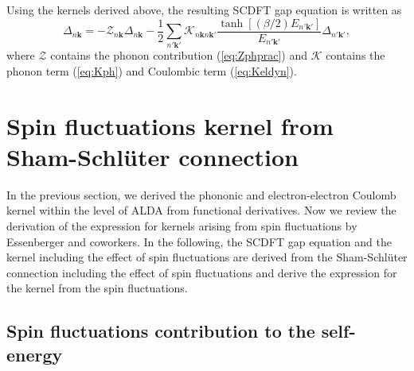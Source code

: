 Using the kernels derived above, the resulting SCDFT gap equation is written as
%
\begin{equation}
	\Delta_{n\bm k} = -{\mathcal Z}_{n \bm k}\Delta_{n\bm k} - \frac{1}{2}
	\sum_{n'\bm k'}{\mathcal K}_{n\bm k n \bm k'}
	\frac{\tanh[(\beta/2)E_{n' \bm k'}]}{E_{n' \bm k'}}\Delta_{n' \bm k'},
	\label{eq:truegapeq}
\end{equation}
%
where $\mathcal Z$ contains the phonon contribution (\ref{eq:Zphprac}) and $\mathcal K$ contains 
the phonon term (\ref{eq:Kph}) and Coulombic term (\ref{eq:Keldyn}).
\section{Spin fluctuations kernel from Sham-Schl\"{u}ter connection}
In the previous section, we derived the phononic and 
electron-electron Coulomb kernel within the level of ALDA from functional derivatives.
Now we review the derivation of the expression for kernels arising 
from spin fluctuations by Essenberger and coworkers\cite{Essenberger2014}.
In the following, the SCDFT gap equation and the kernel including the effect of spin fluctuations 
are derived from the Sham-Schl\"{u}ter connection
including the effect of spin fluctuations and derive the expression for the kernel from the spin fluctuations.

\subsection{Spin fluctuations contribution to the self-energy}

